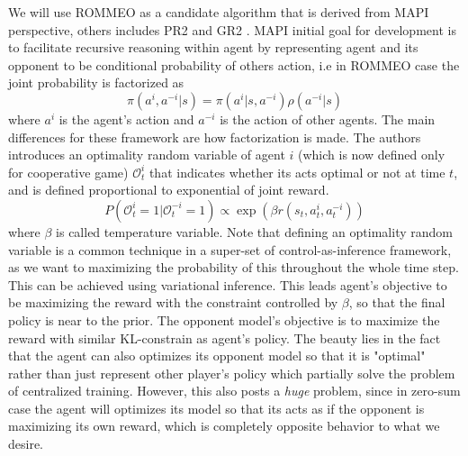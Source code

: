 We will use ROMMEO \cite{tian2019regularized} as a candidate algorithm that is derived from MAPI perspective, others includes PR2 \cite{wen2019probabilistic} and GR2 \cite{wen2019multi}. MAPI initial goal for development is to facilitate recursive reasoning within agent by representing agent and its opponent to be conditional probability of others action, i.e in ROMMEO case the joint probability is factorized as
\begin{equation*}
    \pi(a^{i}, a^{-i} | s) = \pi(a^{i} | s, a^{-i}) \rho(a^{-i} | s)
\end{equation*}
where $a^i$ is the agent's action and $a^{-i}$ is the action of other agents. The main differences for these framework are how factorization is made. The authors introduces an optimality random variable of agent $i$ (which is now defined only for cooperative game) $\mathcal{O}^{i}_t$ that indicates whether its acts optimal or not at time $t$, and is defined proportional to exponential of joint reward.
\begin{equation*}
    P(\mathcal{O}^{i}_t = 1 | \mathcal{O}^{-i}_t = 1) \propto \exp\left( \beta r(s_t, a^i_t, a^{-i}_t) \right)
\end{equation*}
where $\beta$ is called temperature variable. Note that defining an optimality random variable is a common technique in a super-set of control-as-inference framework, as we want to maximizing the probability of this throughout the whole time step. This can be achieved using variational inference. This leads agent's objective to be maximizing the reward with the constraint controlled by $\beta$, so that the final policy is near to the prior. The opponent model's objective is to maximize the reward with similar KL-constrain as agent's policy. The beauty lies in the fact that the agent can also optimizes its opponent model so that it is "optimal" rather than just represent other player's policy which partially solve the problem of centralized training. However, this also posts a \textit{huge} problem, since in zero-sum case the agent will optimizes its model so that its acts as if the opponent is maximizing its own reward, which is completely opposite behavior to what we desire.

